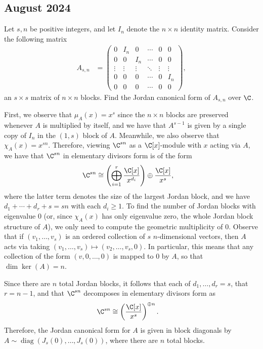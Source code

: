 \documentclass[10pt]{mypackage}
\begin{document}
\subsection{August 2024}%
\begin{problem}[Problem 1]
  Let $s,n$ be positive integers, and let $I_n$ denote the $n\times n$ identity matrix. Consider the following matrix
  \begin{align*}
    A_{s,n} &= \begin{pmatrix}0 & I_n & 0 & \cdots & 0 & 0 \\ 0 & 0 & I_n & \cdots & 0 & 0 \\ \vdots & \vdots & \vdots & \ddots & \vdots & \vdots \\ 0 & 0 & 0 & \cdots & 0 & I_n \\ 0 & 0 & 0 & \cdots & 0 & 0\end{pmatrix},
  \end{align*}
  an $s\times s$ matrix of $n\times n$ blocks. Find the Jordan canonical form of $A_{s,n}$ over $\C$.
\end{problem}
\begin{solution}
  First, we observe that $\mu_{A}(x) = x^{s}$ since the $n\times n$ blocks are preserved whenever $A$ is multiplied by itself, and we have that $A^{s-1}$ is given by a single copy of $I_n$ in the $(1,s)$ block of $A$. Meanwhile, we also observe that $\chi_A(x) = x^{sn}$. Therefore, viewing $\C^{sn}$ as a $\C[x]$-module with $x$ acting via $A$, we have that $\C^{sn}$ in elementary divisors form is of the form
  \begin{align*}
    \C^{sn} &\cong \left( \bigoplus_{i=1}^{r} \frac{\C[x]}{x^{d_i}} \right) \oplus \frac{\C[x]}{x^{s}},
  \end{align*}
  where the latter term denotes the size of the largest Jordan block, and we have $d_1 + \cdots + d_r + s = sn$ with each $d_i\geq 1$. To find the number of Jordan blocks with eigenvalue $0$ (or, since $\chi_A(x)$ has only eigenvalue zero, the whole Jordan block structure of $A$), we only need to compute the geometric multiplicity of $0$. Observe that if $\left( v_1,\dots,v_s \right)$ is an ordered collection of $s$ $n$-dimensional vectors, then $A$ acts via taking $\left( v_1,\dots,v_s \right)\mapsto \left( v_2,\dots,v_s,0 \right)$. In particular, this means that any collection of the form $\left( v,0,\dots,0 \right)$ is mapped to $0$ by $A$, so that $\dim\ker\left( A \right) = n$.

  Since there are $n$ total Jordan blocks, it follows that each of $d_1,\dots,d_r = s$, that $r = n-1$, and that $\C^{sn}$ decomposes in elementary divisors form as
  \begin{align*}
    \C^{sn} &\cong \left( \frac{\C[x]}{x^{s}} \right)^{\oplus n}.
  \end{align*}
  Therefore, the Jordan canonical form for $A$ is given in block diagonals by $A \sim \operatorname{diag}\left( J_s(0),\dots,J_s(0) \right)$, where there are $n$ total blocks.
\end{solution}
\end{document}
